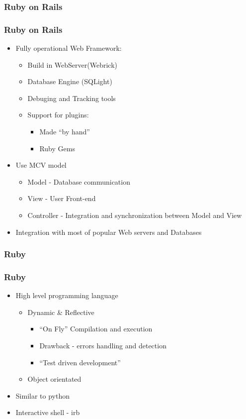 \documentclass{beamer}
\begin{document}
\subsubsection{Ruby on Rails}

\begin{frame}
  \frametitle{Ruby on Rails}
  \begin{itemize}
    \item Fully operational Web Framework:
      \begin{itemize}
        \item Build in WebServer(Webrick)
        \item Database Engine (SQLight)
        \item Debuging and Tracking tools
        \item Support for plugins:
          \begin{itemize}
            \item Made ``by hand''
            \item Ruby Gems 
          \end{itemize}

      \end{itemize}
    \item Use MCV model
      \begin{itemize}
        \item Model - Database communication
        \item View - User Front-end
        \item Controller - Integration and synchronization between Model and View
      \end{itemize}
    \item Integration with most of popular Web servers and Databases

  \end{itemize}
  
\end{frame}

\subsubsection{Ruby}
\begin{frame}
  \frametitle{Ruby}
  \begin{itemize}
    \item High level programming language
      \begin{itemize}
        \item Dynamic \& Reflective
          \begin{itemize}
            \item ``On Fly'' Compilation and execution
            \item Drawback - errors handling and detection
            \item ``Test driven development''
          \end{itemize}
        \item Object orientated
      \end{itemize}
    \item Similar to python
    \item Interactive shell - irb
\end{itemize}
\end{frame}
\end{document}
